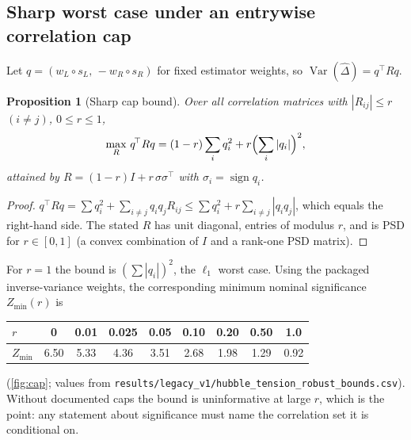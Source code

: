 \documentclass[11pt,a4paper]{article}
\newtheorem{proposition}{Proposition}
\theoremstyle{remark}\newtheorem{remark}{Remark}
\DeclareMathOperator{\Var}{Var}\DeclareMathOperator{\Cov}{Cov}\DeclareMathOperator{\Corr}{Corr}
\begin{document}
\subsection{Sharp worst case under an entrywise correlation cap}\label{sec:cap}
Let $q=(w_L\circ s_L,\,-w_R\circ s_R)$ for fixed estimator weights, so $\Var(\widehat\Delta)=q^{\!\top}Rq$.
\begin{proposition}[Sharp cap bound]\label{prop:cap}
Over all correlation matrices with $|R_{ij}|\le r$ $(i\ne j)$, $0\le r\le1$,
\begin{equation}
\max_R\,q^{\!\top}Rq=(1-r)\sum_iq_i^2+r\Bigl(\sum_i|q_i|\Bigr)^2,
\end{equation}
attained by $R=(1-r)I+r\,\sigma\sigma^{\!\top}$ with $\sigma_i=\operatorname{sign}q_i$.
\end{proposition}
\begin{proof}
$q^{\!\top}Rq=\sum q_i^2+\sum_{i\ne j}q_iq_jR_{ij}\le\sum q_i^2+r\sum_{i\ne j}|q_iq_j|$, which equals the right-hand side. The stated $R$ has unit diagonal, entries of modulus $r$, and is PSD for $r\in[0,1]$ (a convex combination of $I$ and a rank-one PSD matrix).
\end{proof}
\noindent For $r=1$ the bound is $(\sum|q_i|)^2$, the $\ell_1$ worst case. Using the packaged inverse-variance weights, the corresponding minimum nominal significance $Z_{\min}(r)$ is
\begin{center}\small\begin{tabular}{@{}lcccccccc@{}}\toprule
$r$ & 0 & 0.01 & 0.025 & 0.05 & 0.10 & 0.20 & 0.50 & 1.0\\\midrule
$Z_{\min}$ & 6.50 & 5.33 & 4.36 & 3.51 & 2.68 & 1.98 & 1.29 & 0.92\\\bottomrule\end{tabular}\end{center}
(\cref{fig:cap}; values from \texttt{results/legacy\_v1/hubble\_tension\_robust\_bounds.csv}). Without documented caps the bound is uninformative at large $r$, which is the point: any statement about significance must name the correlation set it is conditional on.
\end{document}
